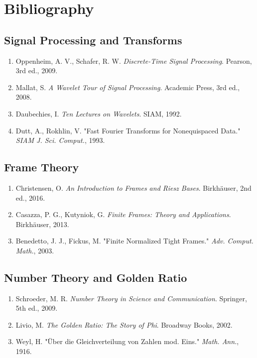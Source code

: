 \documentclass[11pt, a4paper, openany]{book}
\theoremstyle{definition}
\begin{document}
\backmatter
\chapter*{Bibliography}

\section*{Signal Processing and Transforms}
\begin{enumerate}
    \item Oppenheim, A. V., Schafer, R. W. \textit{Discrete-Time Signal Processing}. Pearson, 3rd ed., 2009.
    \item Mallat, S. \textit{A Wavelet Tour of Signal Processing}. Academic Press, 3rd ed., 2008.
    \item Daubechies, I. \textit{Ten Lectures on Wavelets}. SIAM, 1992.
    \item Dutt, A., Rokhlin, V. "Fast Fourier Transforms for Nonequispaced Data." \textit{SIAM J. Sci. Comput.}, 1993.
\end{enumerate}

\section*{Frame Theory}
\begin{enumerate}[resume]
    \item Christensen, O. \textit{An Introduction to Frames and Riesz Bases}. Birkhäuser, 2nd ed., 2016.
    \item Casazza, P. G., Kutyniok, G. \textit{Finite Frames: Theory and Applications}. Birkhäuser, 2013.
    \item Benedetto, J. J., Fickus, M. "Finite Normalized Tight Frames." \textit{Adv. Comput. Math.}, 2003.
\end{enumerate}

\section*{Number Theory and Golden Ratio}
\begin{enumerate}[resume]
    \item Schroeder, M. R. \textit{Number Theory in Science and Communication}. Springer, 5th ed., 2009.
    \item Livio, M. \textit{The Golden Ratio: The Story of Phi}. Broadway Books, 2002.
    \item Weyl, H. "Über die Gleichverteilung von Zahlen mod. Eins." \textit{Math. Ann.}, 1916.
\end{enumerate}
\end{document}

